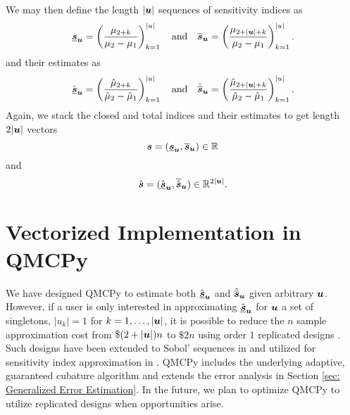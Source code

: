 \documentclass{article}[12pt]
\begin{document}
We may then define the length $\lvert \boldsymbol{u} \rvert$ sequences of sensitivity indices as 
\begin{equation}
    \label{eq:bs_split}
    \underline{\boldsymbol{s}}_{\boldsymbol{u}} = \left(\frac{\mu_{2+k}}{\mu_2-\mu_1}\right)_{k=1}^{\lvert u \rvert} \quad \text{and} \quad 
    \overline{\boldsymbol{s}}_{\boldsymbol{u}} = \left(\frac{\mu_{2+\lvert \boldsymbol{u} \rvert + k}}{\mu_2-\mu_1}\right)_{k=1}^{\lvert u \rvert}.
\end{equation}
and their estimates as 
\begin{equation}
    \label{eq:bs_hat_split}
    \hat{\underline{\boldsymbol{s}}}_{\boldsymbol{u}} = \left(\frac{\hat{\mu}_{2+k}}{\hat{\mu}_2-\hat{\mu}_1}\right)_{k=1}^{\lvert u \rvert} \quad \text{and} \quad 
    \hat{\overline{\boldsymbol{s}}}_{\boldsymbol{u}} = \left(\frac{\hat{\mu}_{2+\lvert \boldsymbol{u} \rvert + k}}{\hat{\mu}_2-\hat{\mu}_1}\right)_{k=1}^{\lvert u \rvert}.
\end{equation}
Again, we stack the closed and total indices and their estimates to get length $2\lvert \boldsymbol{u} \rvert$ vectors 
\begin{equation}
    \label{eq:bs}
    \boldsymbol{s} = (\underline{\boldsymbol{s}}_{\boldsymbol{u}},\overline{\boldsymbol{s}}_{\boldsymbol{u}}) \in \mathbb{R}^{}
\end{equation}
and 
\begin{equation}
    \label{eq:bs_hat}
    \hat{\boldsymbol{s}} = (\underline{\hat{\boldsymbol{s}}}_{\boldsymbol{u}},\overline{\hat{\boldsymbol{s}}}_{\boldsymbol{u}}) \in \mathbb{R}^{2\lvert \boldsymbol{u} \rvert}.
\end{equation}


\section{Vectorized Implementation in QMCPy}

We have designed QMCPy to estimate both $\hat{\underline{\boldsymbol{s}}}_{\boldsymbol{u}}$ and $\hat{\overline{\boldsymbol{s}}}_{\boldsymbol{u}}$ given arbitrary $\boldsymbol{u}$. However, if a user is only interested in approximating $\hat{\underline{\boldsymbol{s}}}_{\boldsymbol{u}}$ for $\boldsymbol{u}$ a set of singletons, $\lvert u_k \rvert = 1$ for $k=1, \dots, \lvert \boldsymbol{u} \rvert$, it is possible to reduce the $n$ sample approximation cost from $\$(2+\lvert \boldsymbol{u} \rvert)n$ to $\$2n$ using order $1$ replicated designs \cite{alex2008comparison,tissot2015randomized}. Such designs have been extended to  Sobol' sequences  in \cite{replicated_designs_sobol_seq} and utilized for sensitivity index approximation in \cite{reliable_sobol_indices_approx}. QMCPy includes the underlying adaptive, guaranteed cubature algorithm \cite{cubqmcsobol} and extends the error analysis in Section \ref{sec: Generalized Error Estimation}. In the future, we plan to optimize QMCPy to utilize replicated designs when opportunities arise.
\end{document}
